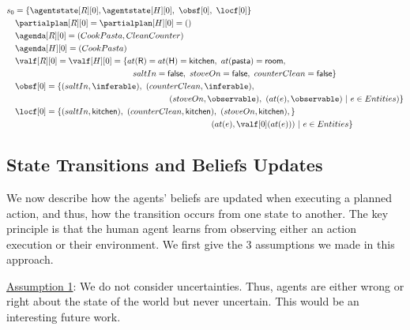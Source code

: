 
{\small
\noindent
\begin{align*}
&s_0 = \{\agentstate[R][0], \agentstate[H][0],~\obsf[0],~\locf[0]\} \\
&\quad \partialplan[R][0] = \partialplan[H][0] = ()\\
&\quad \agenda[R][0] = (CookPasta, CleanCounter)\\
&\quad \agenda[H][0] = (CookPasta)\\
&\quad \valf[R][0] = \valf[H][0] = \{at(\textsf{R}) = at(\textsf{H}) = \textsf{kitchen},~at(\textsf{pasta})=\textsf{room},\\
&\qquad \qquad \qquad \qquad \qquad \qquad \qquad \quad saltIn = \textsf{false},~stoveOn = \textsf{false},~counterClean = \textsf{false}\}\\
&\quad \obsf[0] = \{ (saltIn,\inferable),~(counterClean,\inferable),\\
&\qquad \qquad \qquad \qquad \qquad \qquad \qquad \qquad \qquad \quad \ (stoveOn,\observable),~(at(e),\observable) ~|~ e \in Entities)\}\\
&\quad \locf[0] = \{ (saltIn,\textsf{kitchen}),~(counterClean,\textsf{kitchen}),~(stoveOn,\textsf{kitchen}), \}\\
&\qquad \qquad \qquad \qquad \qquad \qquad \qquad \qquad \qquad \qquad \qquad \qquad \ (at(e),\valf[0](at(e))) ~|~ e \in Entities \}
\end{align*}

    \subsection{State Transitions and Beliefs Updates}

We now describe how the agents' beliefs are updated when executing a planned action, and thus, how the transition occurs from one state to another. The key principle is that the human agent learns from observing either an action execution or their environment. We first give the 3 assumptions we made in this approach.

\underline{Assumption 1}: We do not consider uncertainties. Thus, agents are either wrong or right about the state of the world but never uncertain. This would be an interesting future work. 

}

